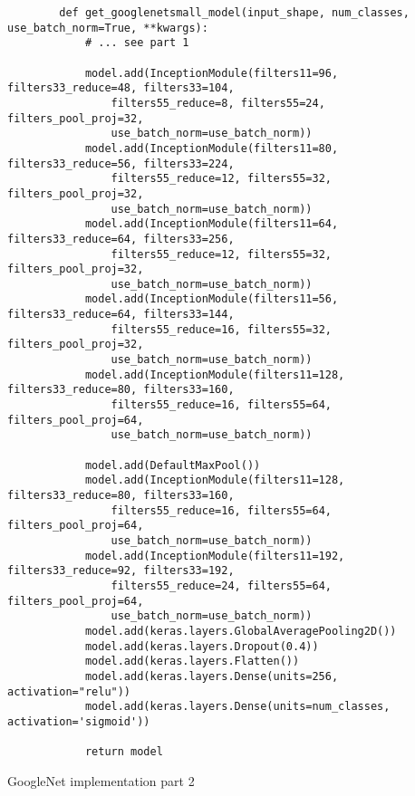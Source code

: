 \begin{listing}
    \begin{verbatim}
        def get_googlenetsmall_model(input_shape, num_classes, use_batch_norm=True, **kwargs):
            # ... see part 1

            model.add(InceptionModule(filters11=96, filters33_reduce=48, filters33=104,
                filters55_reduce=8, filters55=24, filters_pool_proj=32,
                use_batch_norm=use_batch_norm))
            model.add(InceptionModule(filters11=80, filters33_reduce=56, filters33=224,
                filters55_reduce=12, filters55=32, filters_pool_proj=32,
                use_batch_norm=use_batch_norm))
            model.add(InceptionModule(filters11=64, filters33_reduce=64, filters33=256,
                filters55_reduce=12, filters55=32, filters_pool_proj=32,
                use_batch_norm=use_batch_norm))
            model.add(InceptionModule(filters11=56, filters33_reduce=64, filters33=144,
                filters55_reduce=16, filters55=32, filters_pool_proj=32,
                use_batch_norm=use_batch_norm))
            model.add(InceptionModule(filters11=128, filters33_reduce=80, filters33=160,
                filters55_reduce=16, filters55=64, filters_pool_proj=64,
                use_batch_norm=use_batch_norm))

            model.add(DefaultMaxPool())
            model.add(InceptionModule(filters11=128, filters33_reduce=80, filters33=160,
                filters55_reduce=16, filters55=64, filters_pool_proj=64,
                use_batch_norm=use_batch_norm))
            model.add(InceptionModule(filters11=192, filters33_reduce=92, filters33=192,
                filters55_reduce=24, filters55=64, filters_pool_proj=64,
                use_batch_norm=use_batch_norm))
            model.add(keras.layers.GlobalAveragePooling2D())
            model.add(keras.layers.Dropout(0.4))
            model.add(keras.layers.Flatten())
            model.add(keras.layers.Dense(units=256, activation="relu"))
            model.add(keras.layers.Dense(units=num_classes, activation='sigmoid'))

            return model
    \end{verbatim}
    \caption[GoogleNet implementation part 1]{GoogleNet implementation part 2}
    \label{code:keras-googlenet-small-replication}
\end{listing}



